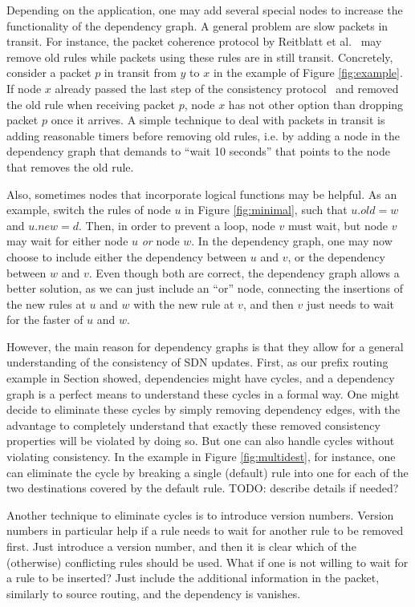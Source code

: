 Depending on the application, one may add several special nodes to increase the functionality of the dependency graph. A general problem are slow packets in transit. For instance, the packet coherence protocol by Reitblatt et al.~\cite{safeupdates} may remove old rules while packets using these rules are in still transit. Concretely, consider a packet $p$ in transit from $y$ to $x$ in the example of Figure \ref{fig:example}. If node $x$ already passed the last step of the consistency protocol~\cite{safeupdates} and removed the old rule when receiving packet $p$, node $x$ has not other option than dropping packet $p$ once it arrives. A simple technique to deal with packets in transit is adding reasonable timers before removing old rules, i.e. by adding a node in the dependency graph that demands to ``wait 10 seconds'' that points to the node that removes the old rule.

Also, sometimes nodes that incorporate logical functions may be helpful. As an example, switch the rules of node $u$ in Figure \ref{fig:minimal}, such that $u.old = w$ and $u.new = d$. Then, in order to prevent a loop, node $v$ must wait, but node $v$ may wait for either node $u$ \emph{or} node $w$. In the dependency graph, one may now choose to include either the dependency between $u$ and $v$, or the dependency between $w$ and $v$. Even though both are correct, the dependency graph allows a better solution, as we can just include an ``or'' node, connecting the insertions of the new rules at $u$ and $w$ with the new rule at $v$, and then $v$ just needs to wait for the faster of $u$ and $w$.

However, the main reason for dependency graphs is that they allow for a general understanding of the consistency of SDN updates. First, as our prefix routing example in Section \label{ref:multidest} showed, dependencies might have cycles, and a dependency graph is a perfect means to understand these cycles in a formal way. One might decide to eliminate these cycles by simply removing dependency edges, with the advantage to completely understand that exactly these removed consistency properties will be violated by doing so. But one can also handle cycles without violating consistency. In the example in Figure \ref{fig:multidest}, for instance, one can eliminate the cycle by breaking a single (default) rule into one for each of the two destinations covered by the default rule. TODO: describe details if needed?

Another technique to eliminate cycles is to introduce version numbers. Version numbers in particular help if a rule needs to wait for another rule to be removed first. Just introduce a version number, and then it is clear which of the (otherwise) conflicting rules should be used. What if one is not willing to wait for a rule to be inserted? Just include the additional information in the packet, similarly to source routing, and the dependency is vanishes.

